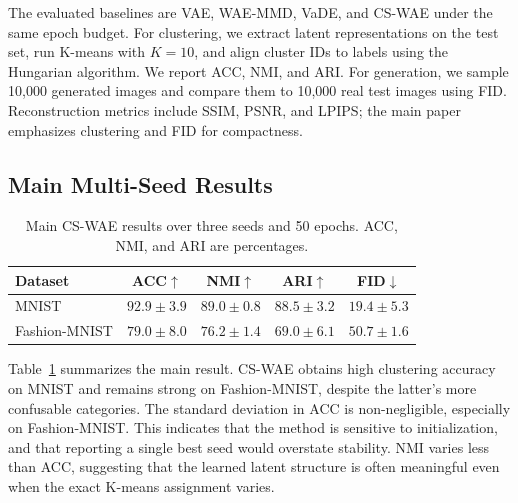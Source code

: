 \documentclass[10pt]{article}
\begin{document}
The evaluated baselines are VAE, WAE-MMD, VaDE, and CS-WAE under the same epoch budget. For clustering, we extract latent representations on the test set, run K-means with $K=10$, and align cluster IDs to labels using the Hungarian algorithm. We report ACC, NMI, and ARI. For generation, we sample 10,000 generated images and compare them to 10,000 real test images using FID. Reconstruction metrics include SSIM, PSNR, and LPIPS; the main paper emphasizes clustering and FID for compactness.

\subsection{Main Multi-Seed Results}

\begin{table}[t]
\centering
\caption{Main CS-WAE results over three seeds and 50 epochs. ACC, NMI, and ARI are percentages.}
\label{tab:main}
\begin{tabular}{lcccc}
\toprule
Dataset & ACC$\uparrow$ & NMI$\uparrow$ & ARI$\uparrow$ & FID$\downarrow$ \\
\midrule
MNIST & $92.9 \pm 3.9$ & $89.0 \pm 0.8$ & $88.5 \pm 3.2$ & $19.4 \pm 5.3$ \\
Fashion-MNIST & $79.0 \pm 8.0$ & $76.2 \pm 1.4$ & $69.0 \pm 6.1$ & $50.7 \pm 1.6$ \\
\bottomrule
\end{tabular}
\end{table}

Table~\ref{tab:main} summarizes the main result. CS-WAE obtains high clustering accuracy on MNIST and remains strong on Fashion-MNIST, despite the latter's more confusable categories. The standard deviation in ACC is non-negligible, especially on Fashion-MNIST. This indicates that the method is sensitive to initialization, and that reporting a single best seed would overstate stability. NMI varies less than ACC, suggesting that the learned latent structure is often meaningful even when the exact K-means assignment varies.
\end{document}
